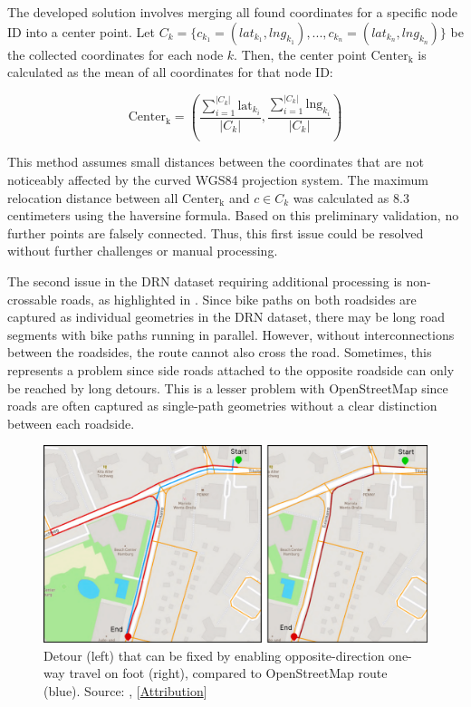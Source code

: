 The developed solution involves merging all found coordinates for a specific node ID into a center point. Let $C_k = \{c_{k_1} = (lat_{k_1}, lng_{k_1}), \text{...} , c_{k_n} = (lat_{k_n}, lng_{k_n})\}$ be the collected coordinates for each node $k$. Then, the center point $\text{Center}_{\text{k}}$ is calculated as the mean of all coordinates for that node ID:

\begin{equation}\text{Center}_{\text{k}} = \left(\frac{\sum_{i=1}^{|C_k|} \text{{lat}}_{k_i}}{|C_k|}, \frac{\sum_{i=1}^{|C_k|} \text{{lng}}_{k_i}}{|C_k|}\right)\end{equation}

This method assumes small distances between the coordinates that are not noticeably affected by the curved WGS84 projection system. The maximum relocation distance between all $\text{Center}_{\text{k}}$ and $c \in C_k$ was calculated as 8.3 centimeters using the haversine formula. Based on this preliminary validation, no further points are falsely connected. Thus, this first issue could be resolved without further challenges or manual processing.

The second issue in the DRN dataset requiring additional processing is non-crossable roads, as highlighted in . Since bike paths on both roadsides are captured as individual geometries in the DRN dataset, there may be long road segments with bike paths running in parallel. However, without interconnections between the roadsides, the route cannot also cross the road. Sometimes, this represents a problem since side roads attached to the opposite roadside can only be reached by long detours. This is a lesser problem with OpenStreetMap since roads are often captured as single-path geometries without a clear distinction between each roadside. 

\begin{figure}[htbp]
\centering
\includegraphics[width=\linewidth]{images/oneway-travel-fix.pdf}
\caption{Detour (left) that can be fixed by enabling opposite-direction one-way travel on foot (right), compared to OpenStreetMap route (blue). Source: \cite{lorenz_2022}, [\hyperref[attribution]{Attribution}]}
\label{fig:oneway-travel-fix}
\end{figure}

